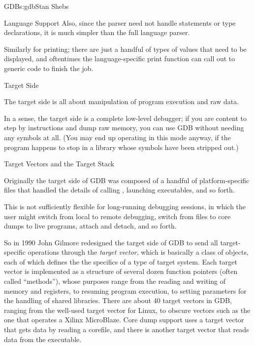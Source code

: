 \begin{aosachapter}{GDB}{s:gdb}{Stan Shebs}
\begin{aosasect2}{Language Support}
Also, since the parser need not handle statements or type
declarations, it is much simpler than the full language parser.

Similarly for printing; there are just a handful of types of values
that need to be displayed, and oftentimes the language-specific print
function can call out to generic code to finish the job.

\end{aosasect2}

\begin{aosasect1}{Target Side}

The target side is all about manipulation of program execution and raw
data.

In a sense, the target side is a complete low-level debugger; if you
are content to step by instructions and dump raw memory, you can use
GDB without needing any symbols at all.  (You may end up operating in
this mode anyway, if the program happens to stop in a library whose
symbols have been stripped out.)

\begin{aosasect2}{Target Vectors and the Target Stack}

Originally the target side of GDB was composed of a handful of
platform-specific files that handled the details of calling
, launching executables, and so forth.

This is not sufficiently flexible for long-running debugging sessions,
in which the user might switch from local to remote debugging, switch
from files to core dumps to live programs, attach and detach, and so
forth.

So in 1990 John Gilmore redesigned the target side of GDB to send all
target-specific operations through the {\em target vector}, which is
basically a class of objects, each of which defines the the specifics
of a type of target system.  Each target vector is implemented as a
structure of several dozen function pointers (often called
``methods''), whose purposes range from the reading and writing of
memory and registers, to resuming program execution, to setting
parameters for the handling of shared libraries.  There are about 40
target vectors in GDB, ranging from the well-used target vector for
Linux, to obscure vectors such as the one that operates a Xilinx
MicroBlaze.  Core dump support uses a target vector that gets data by
reading a corefile, and there is another target vector that reads data
from the executable.


\end{aosasect2}
\end{aosasect1}
\end{aosachapter}
